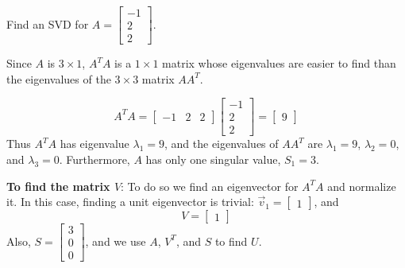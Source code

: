 \documentclass{ximera}
\begin{document}
\begin{example}\label{ex:SVD3x1}
Find an SVD for
$A=\left[\begin{array}{r} -1 \\ 2\\ 2 \end{array}\right]$.
 
\begin{explanation}
Since $A$ is $3\times 1$, $A^T A$ is a $1\times 1$ matrix
whose eigenvalues are easier to find than the eigenvalues of
the $3\times 3$ matrix $AA^T$.
 
\[ A^TA=\left[\begin{array}{ccc} -1 & 2 & 2 \end{array}\right]
\left[\begin{array}{r} -1 \\ 2 \\ 2 \end{array}\right]
=\left[\begin{array}{r} 9 \end{array}\right]\]
Thus $A^TA$ has eigenvalue $\lambda_1=9$, and
the eigenvalues of $AA^T$ are $\lambda_1=9$, $\lambda_2=0$, and
$\lambda_3=0$.
Furthermore, $A$ has only one singular value, $S_1=3$.
 
\textbf{To find the matrix $V$}:
To do so we find an eigenvector for $A^TA$ and
normalize it.
In this case, finding a unit eigenvector is trivial:
$\vec{v}_1=\left[\begin{array}{r} 1 \end{array}\right]$, and
\[ V=\left[\begin{array}{r} 1 \end{array}\right]\]
Also,
$S =\left[\begin{array}{r} 3 \\ 0\\ 0 \end{array}\right]$,
and we use $A$, $V^T$, and $S$ to find $U$.
 

\end{explanation}
\end{example}
\end{document}

